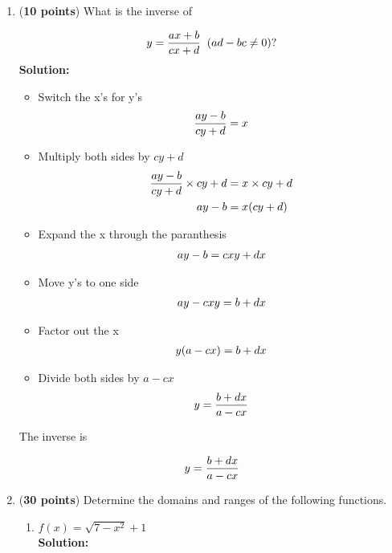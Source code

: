 \documentclass[a4paper]{article}
\begin{document}
\begin{enumerate}
\item (\textbf{10 points}) What is the inverse of 

\begin{equation}
	y = \frac{ax + b}{cx + d} \; \; (ad - bc \neq 0)? \notag
\end{equation}
\textbf{Solution:}\\

\begin{itemize}
	\item Switch the x's for y's
	\begin{align*}
	\frac{ay - b}{cy + d} = x \notag\\
	\end{align*}	
	\item Multiply both sides by $cy+d$
	\begin{align*}
	\frac{ay - b}{cy + d} \times cy + d &= x  \times cy + d\notag\\
	ay -b &= x(cy+d)\notag
	\end{align*}
	\item Expand the x through the paranthesis
	\begin{align*}
	ay-b = cxy + dx\notag
	\end{align*}
	\item Move y's to one side
	\begin{align*}
	ay-cxy = b + dx\notag
	\end{align*}
	\item Factor out the x
	\begin{align*}
	y(a - cx) = b + dx\notag
	\end{align*}
	\item Divide both sides by $a - cx$
	\begin{align*}
	y = \frac{b+dx}{a - cx}\notag
	\end{align*}
\end{itemize}

The inverse is

\begin{equation}
	y = \frac{b + dx}{a - cx}\notag
\end{equation}



\item (\textbf{30 points}) Determine the domains and ranges of the following functions.

\begin{enumerate}
	\item $f(x) = \sqrt{7-x^2} + 1$\\
	\textbf{Solution:}\\
	

\end{enumerate}
\end{enumerate}
\end{document}
